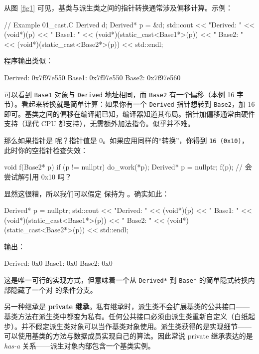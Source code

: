 从图 \ref{fig1} 可见，基类与派生类之间的指针转换通常涉及偏移计算。示例：

\begin{code}
// Example 01_cast.C
Derived d;
Derived* p = &d;
std::cout << "Derived: " << (void*)(p) <<
  " Base1: " << (void*)(static_cast<Base1*>(p)) <<
  " Base2: " << (void*)(static_cast<Base2*>(p)) <<
  std::endl;
\end{code}

程序输出类似：

\begin{code}
Derived: 0x7f97e550 Base1: 0x7f97e550 Base2: 0x7f97e560
\end{code}

可以看到 \texttt{Base1} 对象与 \texttt{Derived} 地址相同，而 \texttt{Base2} 有一个偏移（本例 16 字节）。看起来转换就是简单计算：如果你有一个 \texttt{Derived} 指针想转到 \texttt{Base2}，加 16 即可。基类之间的偏移在编译期已知，编译器知道其布局。指针加偏移通常由硬件支持（现代 CPU 都支持），无需额外加法指令。似乎并不难。

那么如果指针是  呢？指针值是 0。如果应用同样的“转换”，你得到 \texttt{16 (0x10)}，此时你的空指针检查失效：

\begin{code}
void f(Base2* p) {
  if (p != nullptr) do_work(*p);
}
Derived* p = nullptr;
f(p); // 会尝试解引用 0x10 吗？
\end{code}

显然这很糟，所以我们可以假定  保持为 。确实如此：

\begin{code}
Derived* p = nullptr;
std::cout << "Derived: " << (void*)(p) <<
  " Base1: " << (void*)(static_cast<Base1*>(p)) <<
  " Base2: " << (void*)(static_cast<Base2*>(p)) <<
  std::endl;
\end{code}

输出：

\begin{code}
Derived: 0x0 Base1: 0x0 Base2: 0x0
\end{code}

这是唯一可行的实现方式，但意味着一个从 \texttt{Derived*} 到 \texttt{Base*} 的简单隐式转换内部隐藏了一个对  的条件分支。

另一种继承是 \textbf{private 继承}。私有继承时，派生类不会扩展基类的公共接口——基类方法在派生类中都变为私有。任何公共接口必须由派生类重新自定义（白纸起步）。并不假定派生类对象可以当作基类对象使用。派生类获得的是实现细节——可以使用基类的方法与数据成员实现自己的算法。因此常说 private 继承表达的是 \emph{has-a} 关系——派生对象内部包含一个基类实例。


